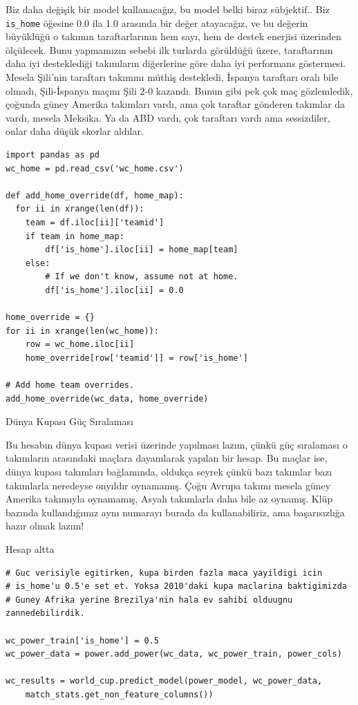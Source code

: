 \documentclass[12pt,fleqn]{article}\usepackage{../../common}
\begin{document}
Biz daha değişik bir model kullanacağız, bu model belki biraz
sübjektif.. Biz \verb!is_home! öğesine 0.0 ila 1.0 arasında bir değer
atayacağız, ve bu değerin büyüklüğü o takımın taraftarlarının hem sayı, hem
de destek enerjisi üzerinden ölçülecek. Bunu yapmamızın sebebi ilk turlarda
görüldüğü üzere, taraftarının daha iyi desteklediği takımların diğerlerine
göre daha iyi performans göstermesi. Mesela Şili'nin taraftarı takımını
müthiş destekledi, İspanya taraftarı oralı bile olmadı, Şili-İspanya maçını
Şili 2-0 kazandı. Bunun gibi pek çok maç gözlemledik, çoğunda güney Amerika
takımları vardı, ama çok taraftar gönderen takımlar da vardı, mesela
Meksika. Ya da ABD vardı, çok taraftarı vardı ama sessizdiler, onlar daha
düşük skorlar aldılar.

\begin{verbatim}
import pandas as pd
wc_home = pd.read_csv('wc_home.csv')

def add_home_override(df, home_map):
  for ii in xrange(len(df)):
    team = df.iloc[ii]['teamid']
    if team in home_map:
        df['is_home'].iloc[ii] = home_map[team]
    else:
        # If we don't know, assume not at home.
        df['is_home'].iloc[ii] = 0.0
        
home_override = {}
for ii in xrange(len(wc_home)):
    row = wc_home.iloc[ii]
    home_override[row['teamid']] = row['is_home']

# Add home team overrides.
add_home_override(wc_data, home_override)    
\end{verbatim}

Dünya Kupası Güç Sıralaması

Bu hesabın dünya kupası verisi üzerinde yapılması lazım, çünkü güç
sıralaması o takımların arasındaki maçlara dayanılarak yapılan bir
hesap. Bu maçlar ise, dünya kupası takımları bağlamında, oldukça seyrek
çünkü bazı takımlar bazı takımlarla neredeyse onyıldır oynamamış. Çoğu
Avrupa takımı mesela güney Amerika takımıyla oynamamış, Asyalı takımlarla
daha bile az oynamış. Klüp bazında kullandığımız aynı numarayı burada da
kullanabiliriz, ama başarısızlığa hazır olmak lazım! 

Hesap altta

\begin{verbatim}
# Guc verisiyle egitirken, kupa birden fazla maca yayildigi icin 
# is_home'u 0.5'e set et. Yoksa 2010'daki kupa maclarina baktigimizda
# Guney Afrika yerine Brezilya'nin hala ev sahibi olduugnu zannedebilirdik.

wc_power_train['is_home'] = 0.5
wc_power_data = power.add_power(wc_data, wc_power_train, power_cols)

wc_results = world_cup.predict_model(power_model, wc_power_data, 
    match_stats.get_non_feature_columns())
\end{verbatim}
\end{document}
